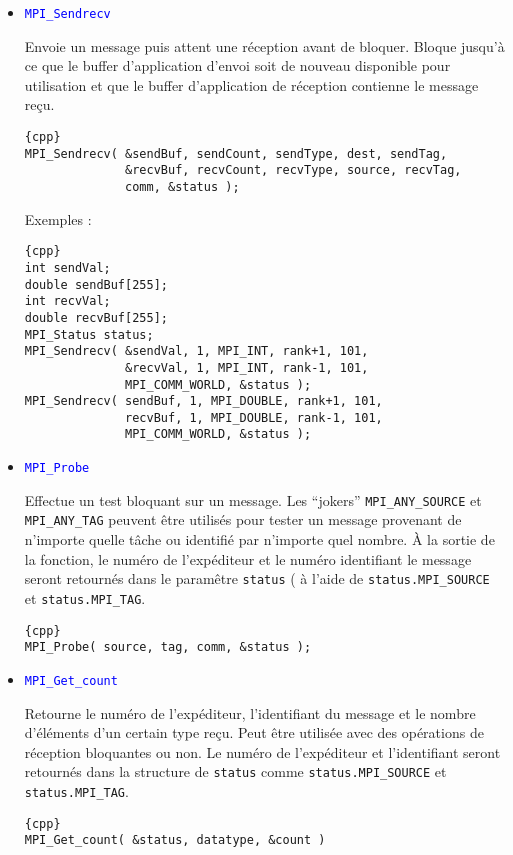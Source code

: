 \documentclass[11pt,a4paper]{article}
\begin{document}
\begin{itemize}
Exemples :
\begin{lstlisting}{cpp}
int val;
double buffer[255];
MPI_Ssend( &val, 1, MPI_INT, rank+1, 101, MPI_COMM_WORLD );
MPI_Ssend( buffer, 255, MPI_DOUBLE, rank+1, 30, MPI_COMM_WORLD );
\end{lstlisting}

\item \textcolor{blue}{\texttt{MPI\_Sendrecv}}

Envoie un message puis attent une réception avant de bloquer. Bloque jusqu'à ce que le buffer d'application
d'envoi soit de nouveau disponible pour utilisation et que le buffer d'application de réception contienne
le message reçu.

\begin{lstlisting}{cpp}
MPI_Sendrecv( &sendBuf, sendCount, sendType, dest, sendTag, 
              &recvBuf, recvCount, recvType, source, recvTag,
              comm, &status );
\end{lstlisting}

Exemples :
\begin{lstlisting}{cpp}
int sendVal;
double sendBuf[255];
int recvVal;
double recvBuf[255];
MPI_Status status;
MPI_Sendrecv( &sendVal, 1, MPI_INT, rank+1, 101,
              &recvVal, 1, MPI_INT, rank-1, 101,
              MPI_COMM_WORLD, &status );
MPI_Sendrecv( sendBuf, 1, MPI_DOUBLE, rank+1, 101,
              recvBuf, 1, MPI_DOUBLE, rank-1, 101,
              MPI_COMM_WORLD, &status ); 
\end{lstlisting}

\item \textcolor{blue}{\texttt{MPI\_Probe}}

Effectue un test bloquant sur un message. Les ``jokers'' \texttt{MPI\_ANY\_SOURCE} et \texttt{MPI\_ANY\_TAG} peuvent être utilisés
pour tester un message provenant de n'importe quelle tâche ou identifié par n'importe quel nombre. \`A la sortie de la fonction,
le numéro de l'expéditeur et le numéro identifiant le message seront retournés dans le paramêtre \texttt{status} ( à l'aide
de \texttt{status.MPI\_SOURCE} et \texttt{status.MPI\_TAG}.

\begin{lstlisting}{cpp}
MPI_Probe( source, tag, comm, &status );
\end{lstlisting}

\item \textcolor{blue}{\texttt{MPI\_Get\_count}}

Retourne le numéro de l'expéditeur, l'identifiant du message et le nombre d'éléments d'un certain type reçu. Peut être utilisée avec des opérations
de réception bloquantes ou non. Le numéro de l'expéditeur et l'identifiant seront retournés dans la structure de \texttt{status} comme 
\texttt{status.MPI\_SOURCE} et \texttt{status.MPI\_TAG}. 

\begin{lstlisting}{cpp}
MPI_Get_count( &status, datatype, &count )
\end{lstlisting}

\end{itemize}
\end{document}

